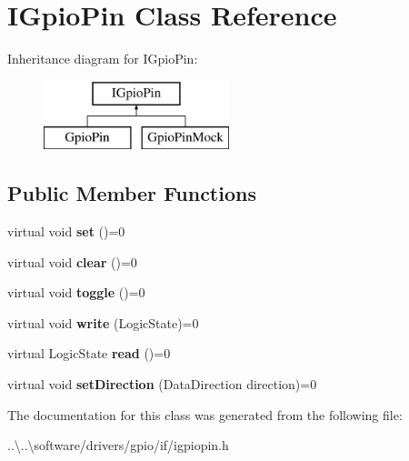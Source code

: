 \hypertarget{class_i_gpio_pin}{}\section{I\+Gpio\+Pin Class Reference}
\label{class_i_gpio_pin}
Inheritance diagram for I\+Gpio\+Pin\+:\begin{figure}[H]
\begin{center}
\leavevmode
\includegraphics[height=2.000000cm]{class_i_gpio_pin}
\end{center}
\end{figure}
\subsection*{Public Member Functions}
\begin{DoxyCompactItemize}
\item 
\mbox{\label{class_i_gpio_pin_aba7fc6b02a422e589f59265531b55d9a}} 
virtual void {\bfseries set} ()=0
\item 
\mbox{\label{class_i_gpio_pin_af51fe6fdf248e4d1a114b72a8dc4e19d}} 
virtual void {\bfseries clear} ()=0
\item 
\mbox{\label{class_i_gpio_pin_a1d068ad689c3d5044c91b6bb3ad63bce}} 
virtual void {\bfseries toggle} ()=0
\item 
\mbox{\label{class_i_gpio_pin_a47200f748224d9a66dc1e7205a43ea20}} 
virtual void {\bfseries write} (Logic\+State)=0
\item 
\mbox{\label{class_i_gpio_pin_a17d8a4224c3317f9c211ed12dfc54126}} 
virtual Logic\+State {\bfseries read} ()=0
\item 
\mbox{\label{class_i_gpio_pin_a4054e58e8681fb028601c72ecd8cd652}} 
virtual void {\bfseries set\+Direction} (Data\+Direction direction)=0
\end{DoxyCompactItemize}


The documentation for this class was generated from the following file\+:\begin{DoxyCompactItemize}
\item 
..\textbackslash{}..\textbackslash{}software/drivers/gpio/if/igpiopin.\+h\end{DoxyCompactItemize}
